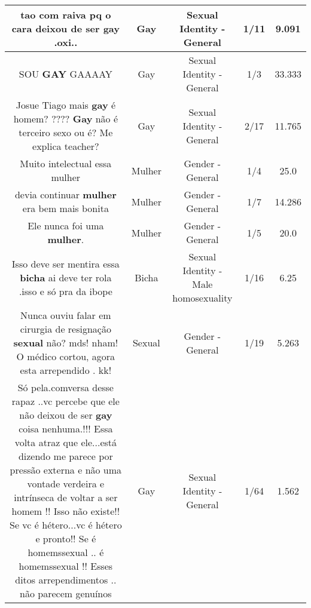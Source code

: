 \documentclass[11pt]{article}
\newlength\mylength
\begin{document}
\begin{center}
\begin{longtable}{|C{.65\mylength}|C{.30\mylength}|C{.12\mylength}|C{.12\mylength}|C{.12\mylength}|}
  \small tao com raiva pq o cara deixou de ser \textbf{gay} .oxi..\normalsize   & Gay & Sexual Identity - General & 1/11 & 9.091 \\  \hline
  \small SOU \textbf{GAY} GAAAAY\normalsize   & Gay & Sexual Identity - General & 1/3 & 33.333 \\  \hline
  \small Josue Tiago mais \textbf{gay} é homem? ???? \textbf{Gay} não  é  terceiro  sexo ou é?  Me explica  teacher?\normalsize   & Gay & Sexual Identity - General & 2/17 & 11.765 \\  \hline
  \small Muito intelectual essa mulher\normalsize   & Mulher & Gender - General & 1/4 & 25.0 \\  \hline
  \small devia continuar \textbf{mulher} era bem mais bonita\normalsize   & Mulher & Gender - General & 1/7 & 14.286 \\  \hline
  \small Ele nunca foi uma \textbf{mulher}.\normalsize   & Mulher & Gender - General & 1/5 & 20.0 \\  \hline
  \small Isso deve ser mentira essa \textbf{bicha} ai deve ter rola .isso e só pra da ibope\normalsize   & Bicha & Sexual Identity - Male homosexuality & 1/16 & 6.25 \\  \hline
  \small Nunca ouviu falar em cirurgia de resignação \textbf{sexual} não? mds! nham! O médico cortou, agora esta arrependido . kk!\normalsize   & Sexual & Gender - General & 1/19 & 5.263 \\  \hline
  \small Só pela.comversa desse rapaz ..vc percebe que ele não deixou de ser \textbf{gay} coisa nenhuma.!!! Essa volta atraz que ele...está dizendo me parece por pressão externa e não uma vontade verdeira e intrínseca de voltar a ser homem !! Isso não existe!! Se vc é hétero...vc é hétero e pronto!! Se é homemssexual .. é homemssexual !! Esses ditos arrependimentos .. não parecem genuínos\normalsize   & Gay & Sexual Identity - General & 1/64 & 1.562 \\  \hline

\end{longtable}
\end{center}
\end{document}
